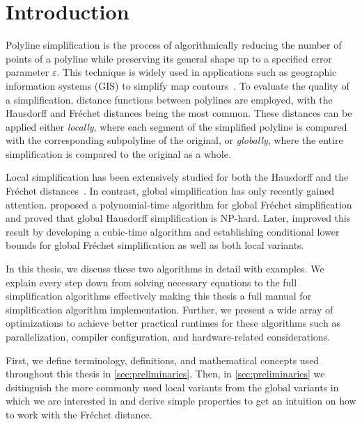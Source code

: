 \section{Introduction}
\label{sec:introduction}

Polyline simplification is the process of algorithmically reducing the number of points of a polyline while preserving its general shape up to a specified error parameter \(\varepsilon\). This technique is widely used in applications such as geographic information systems (GIS) to simplify map contours~\cite{algorithms_reduction_number_points_caricature}. To evaluate the quality of a simplification, distance functions between polylines are employed, with the Hausdorff and Fréchet distances being the most common. These distances can be applied either \emph{locally}, where each segment of the simplified polyline is compared with the corresponding subpolyline of the original, or \emph{globally}, where the entire simplification is compared to the original as a whole.

Local simplification has been extensively studied for both the Hausdorff and the Fréchet distances~\cite{polyline_simplification_under_the_local_frechet_distance_has_almost_quadratic_runtime_in_2d_storandtetal,computational_geometric_methods_for_polygonal_approximations_of_a_curve}. In contrast, global simplification has only recently gained attention. \citeauthor{on_optimal_polyline_simplification_using_the_hausdorff_and_frechet_distance} proposed a polynomial-time algorithm for global Fréchet simplification and proved that global Hausdorff simplification is NP-hard. Later, \citeauthor{polyline_simplification_has_cubic_complexity_bringmannetal} improved this result by developing a cubic-time algorithm and establishing conditional lower bounds for global Fréchet simplification as well as both local variants. 

In this thesis, we discuss these two algorithms in detail with examples. We explain every step down from solving necessary equations to the full simplification algorithms effectively making this thesis a full manual for simplification algorithm implementation. Further, we present a wide array of optimizations to achieve better practical runtimes for these algorithms such as parallelization, compiler configuration, and hardware-related considerations. 

First, we define terminology, definitions, and mathematical concepts used throughout this thesis in \cref{sec:preliminaries}. Then, in \cref{sec:preliminaries} we dsitinguish the more commonly used local variants from the global variants in which we are interested in and derive simple properties to get an intuition on how to work with the Fréchet distance. 

